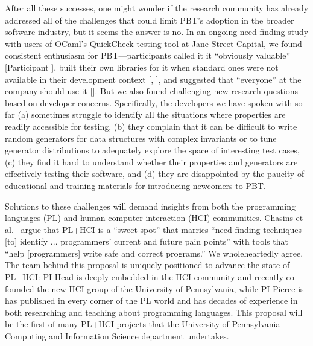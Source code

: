 After all these successes, one might wonder if the research community has already
addressed all of the challenges that could limit PBT's adoption
in the broader software industry, but it
seems the answer is no.
In an ongoing need-finding study with users of OCaml's QuickCheck testing tool
at Jane Street Capital, we found
consistent enthusiasm for PBT---participants called it it
``obviously valuable'' [Participant ],
built their own libraries for it when standard ones were not available in their
development context [,
], and suggested that ``everyone'' at the company should use it
[]. But we also found
challenging new research questions based on developer concerns.
Specifically, the developers we have spoken with so far
%
(a) sometimes struggle
to identify all the situations where properties are readily accessible for
testing,
%
(b) they complain that it
can be difficult to write random generators for data structures
with complex invariants or to tune generator distributions to
adequately explore the space of interesting test cases,
%
(c) they find
it hard to understand whether their properties and generators are
effectively testing their software, and
%
(d) they are disappointed by
the paucity of educational and training materials for introducing
newcomers to PBT.\iflater{}\fi

Solutions to these challenges will demand insights from both the
programming languages (PL) and
human-computer interaction (HCI) communities.  Chasins et
al.~\cite{chasins_pl_2021} argue that PL+HCI is a ``sweet spot'' that marries
``need-finding techniques [to] identify ...  programmers' current and future
pain points'' with tools that ``help [programmers] write safe and correct
programs.'' We wholeheartedly agree.
The team behind this proposal is uniquely positioned to advance the state of
PL+HCI: PI Head is deeply embedded in the HCI community and recently co-founded
the new HCI group of the University of Pennsylvania, while PI Pierce is has
published in every corner of the PL world and has decades of experience in both
researching and teaching about programming languages. This proposal will be the
first of many PL+HCI projects that the University of Pennsylvania Computing and
Information Science department undertakes.\iflater{}\fi

